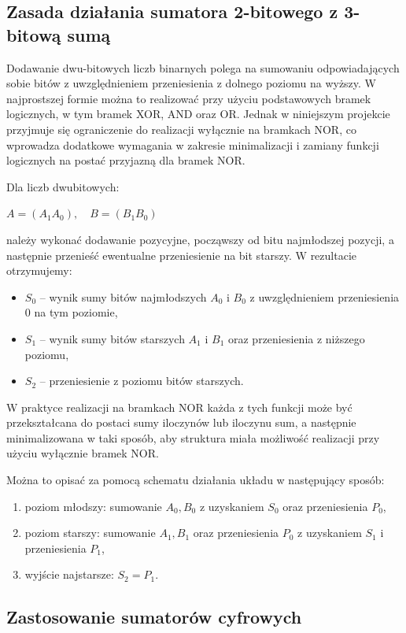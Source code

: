 \documentclass[11pt]{article}
\begin{document}
\subsection{Zasada działania sumatora 2-bitowego z 3-bitową sumą}

Dodawanie dwu-bitowych liczb binarnych polega na sumowaniu odpowiadających sobie bitów z uwzględnieniem przeniesienia z dolnego poziomu na wyższy. W najprostszej formie można to realizować przy użyciu podstawowych bramek logicznych, w tym bramek XOR, AND oraz OR. Jednak w niniejszym projekcie przyjmuje się ograniczenie do realizacji wyłącznie na bramkach NOR, co wprowadza dodatkowe wymagania w zakresie minimalizacji i zamiany funkcji logicznych na postać przyjazną dla bramek NOR.

Dla liczb dwubitowych:
\begin{center}
$A = (A_1 A_0),\quad B = (B_1 B_0)$
\end{center}
należy wykonać dodawanie pozycyjne, począwszy od bitu najmłodszej pozycji, a następnie przenieść ewentualne przeniesienie na bit starszy. W rezultacie otrzymujemy:
\begin{itemize}
    \item \(S_0\) -- wynik sumy bitów najmłodszych \(A_0\) i \(B_0\) z uwzględnieniem przeniesienia 0 na tym poziomie,
    \item \(S_1\) -- wynik sumy bitów starszych \(A_1\) i \(B_1\) oraz przeniesienia z niższego poziomu,
    \item \(S_2\) -- przeniesienie z poziomu bitów starszych.
\end{itemize}

W praktyce realizacji na bramkach NOR każda z tych funkcji może być przekształcana do postaci sumy iloczynów lub iloczynu sum, a następnie minimalizowana w taki sposób, aby struktura miała możliwość realizacji przy użyciu wyłącznie bramek NOR.

Można to opisać za pomocą schematu działania układu w następujący sposób:
\begin{enumerate}
    \item poziom młodszy: sumowanie \(A_0, B_0\) z uzyskaniem \(S_0\) oraz przeniesienia \(P_0\),
    \item poziom starszy: sumowanie \(A_1, B_1\) oraz przeniesienia \(P_0\) z uzyskaniem \(S_1\) i przeniesienia \(P_1\),
    \item wyjście najstarsze: \(S_2 = P_1\).
\end{enumerate}

\subsection{Zastosowanie sumatorów cyfrowych}
\end{document}
